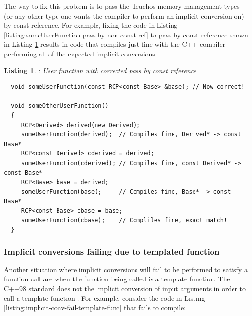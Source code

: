 \documentclass[pdf,ps2pdf,11pt]{SANDreport}
\newtheorem{listing}{Listing}
\begin{document}
The way to fix this problem is to pass the Teuchos memory management
types (or any other type one wants the compiler to perform an implicit
conversion on) by const reference.  For example, fixing the code in
Listing {}\ref{listing:someUserFunction-pass-by-non-const-ref} to pass
by const reference shown in Listing
{}\ref{listing:someUserFunction-pass-by-const-ref} results in code
that compiles just fine with the C++ compiler performing all of the
expected implicit conversions.


{}\begin{listing}: User function with corrected pass by const
reference
\label{listing:someUserFunction-pass-by-const-ref}
{\small\begin{verbatim}
  void someUserFunction(const RCP<const Base> &base); // Now correct!

  void someOtherUserFunction()
  {
     RCP<Derived> derived(new Derived);
     someUserFunction(derived);  // Compiles fine, Derived* -> const Base*
     RCP<const Derived> cderived = derived;
     someUserFunction(cderived); // Compiles fine, const Derived* -> const Base*
     RCP<Base> base = derived;
     someUserFunction(base);     // Compiles fine, Base* -> const Base*
     RCP<const Base> cbase = base;
     someUserFunction(cbase);    // Compliles fine, exact match!
  }
\end{verbatim}}
\end{listing}


%
{}\subsubsection*{Implicit conversions failing due to templated function}
%

Another situation where implicit conversions will fail to be performed
to satisfy a function call are when the function being called is a
template function.  The C++98 standard does not the implicit
conversion of input arguments in order to call a template function
{}\cite[Item 45]{EffectiveC++ThirdEdition}.  For example, consider the
code in Listing {}\ref{listing:implicit-conv-fail-template-func} that
fails to compile:
\end{document}
